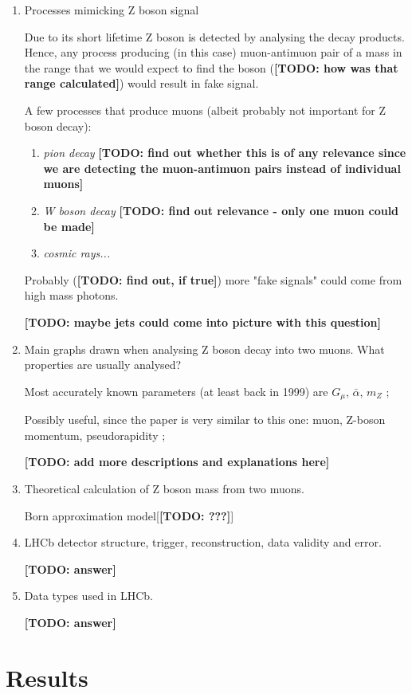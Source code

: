 \documentclass[11pt,a4paper,twoside]{article}
\begin{document}
\begin{enumerate}
        \item Processes mimicking Z boson signal

        Due to its short lifetime Z boson is detected by analysing the decay products. Hence, any process producing (in this case) muon-antimuon pair of a mass in the range that we would expect to find the boson (\textbf{[TODO: how was that range calculated]}) would result in fake signal. 

        A few processes that produce muons (albeit probably not important for Z boson decay):

        \begin{enumerate}
            \item \textit{pion decay} \textbf{[TODO: find out whether this is of any relevance since we are detecting the muon-antimuon pairs instead of individual muons]}
            \item \textit{W boson decay} \textbf{[TODO: find out relevance - only one muon could be made]}
            \item \textit{cosmic rays...}
        \end{enumerate}


        Probably (\textbf{[TODO: find out, if true]}) more "fake signals" could come from high mass photons.

        \textbf{[TODO: maybe jets could come into picture with this question]}

        
        \item Main graphs drawn when analysing Z boson decay into two muons. What properties are usually analysed?


        Most accurately known parameters (at least back in 1999) are $G_{\mu}$, $\bar{\alpha}$, $m_Z$ \cite{novikov1999theory};


        Possibly useful, since the paper is very similar to this one: muon, Z-boson momentum, pseudorapidity \cite{khodaverdian2019accuracy};

        \textbf{[TODO: add more descriptions and explanations here]}


        \item Theoretical calculation of Z boson mass from two muons.

        Born approximation model[\textbf{[TODO: ???]}] \cite{khodaverdian2019accuracy}

        


        \item LHCb detector structure, trigger, reconstruction, data validity and error.

        \textbf{[TODO: answer]}

        \item Data types used in LHCb.

        \textbf{[TODO: answer]}
        
    \end{enumerate}


\section{Results}
    
\singlespacing
	
	


	
\end{document}
